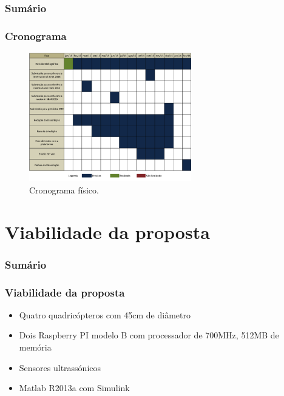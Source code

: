\documentclass{beamer}
\begin{document}
\begin{frame}
	\frametitle{Sumário}
	\tableofcontents[currentsection]
\end{frame}

\begin{frame}
	
	\frametitle{Cronograma}
	
	\begin{figure}[h]
		\centering
		\includegraphics[keepaspectratio = true,
		width=0.63\textwidth]{img/cronograma.png}
		\caption{Cronograma físico.}
		\label{fig:cronograma}
	\end{figure}
	
\end{frame}	

\section{Viabilidade da proposta}

\begin{frame}
	\frametitle{Sumário}
	\tableofcontents[currentsection]
\end{frame}

\begin{frame}
	
	\frametitle{Viabilidade da proposta}
	
	\begin{itemize}	
		
		\item  Quatro quadricópteros com 45cm de diâmetro
		
		\item Dois Raspberry PI modelo B com processador de 700MHz, 512MB de memória
		
		\item Sensores ultrassónicos
		
		\item Matlab R2013a com Simulink
		
	\end{itemize}	
	
	
\end{frame}	
\end{document}
